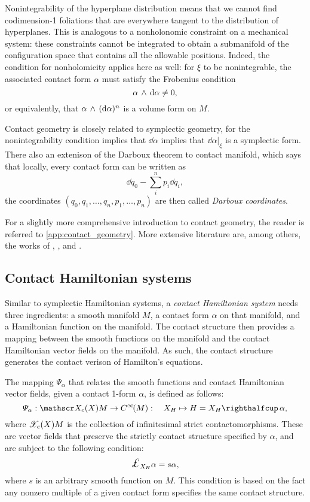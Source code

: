 Nonintegrability of the hyperplane distribution means that we cannot find codimension-1 foliations that are everywhere tangent to the distribution of hyperplanes. This is analogous to a nonholonomic constraint on a mechanical system: these constraints cannot be integrated to obtain a submanifold of the configuration space that contains all the allowable positions. Indeed, the condition for nonholomicity applies here as well: for $\xi$ to be nonintegrable, the associated contact form $\alpha$ must satisfy the Frobenius condition 
$$  \alpha\,\wedge\,\dd{\alpha}  \neq 0, $$
or equivalently, that $ \alpha\,\wedge\,(\dd{\alpha})^n $ is a volume form on $M$. 

Contact geometry is closely related to symplectic geometry, for the nonintegrability condition implies that $\dd{\alpha}$ implies that $\dd{\alpha}\vert_{\xi}$ is a symplectic form. There also an extenison of the Darboux theorem to contact manifold, which says that locally, every contact form can be written as
\begin{equation}
    \dd{q}_0 - \sum_i^n p_i \dd{q}_i, 
    \label{eq:contact_darboux}
\end{equation} 
the coordinates $(q_0, q_1, \ldots, q_n, p_1, \ldots, p_n)$ are then called \emph{Darboux coordinates}.

For a slightly more comprehensive introduction to contact geometry, the reader is referred to \cref{app:contact_geometry}. More extensive literature are, among others, the works of \citet{Geiges2008}, \citet{Libermann1987}, \citet{Arnold1989,Arnold1989a} and \citet{Godbillon1969}.

\subsection{Contact Hamiltonian systems}
Similar to symplectic Hamiltonian systems, a \emph{contact Hamiltonian system} needs three ingredients: a smooth manifold $M$, a contact form $\alpha$ on that manifold, and a Hamiltonian function on the manifold. The contact structure then provides a mapping between the smooth functions on the manifold and the contact Hamiltonian vector fields on the manifold. As such, the contact structure generates the contact verison of Hamilton's equations.

The mapping $\Psi_\alpha$ that relates the smooth functions and contact Hamiltonian vector fields, given a contact 1-form $\alpha$, is defined as follows:
\begin{equation}
    \Psi_\alpha: \vsfields{c}{X}{M} \to \functions{M}: \quad X_H \mapsto H = \intpr{X_H}{\alpha}, 
    \label{eq:psi_definition}
\end{equation}
where $\mathscr{X}_{c}\qty(X){M}$ is the collection of infinitesimal strict contactomorphisms. These are vector fields that preserve the strictly contact structure specified by $\alpha$, and are subject to the following condition:
\begin{equation}
    \lied{X_H}{\alpha} = s \alpha, 
    \label{eq:contact_vf_condition}
\end{equation}
where $s$ is an arbitrary smooth function on $M$. This condition is based on the fact any nonzero multiple of a given contact form specifies the same contact structure.

